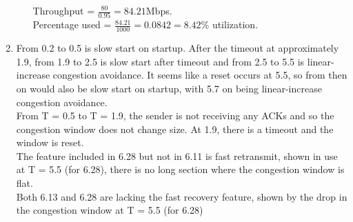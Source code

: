 \documentclass[12pt]{article}
\begin{document}
\begin{enumerate}
\begin{enumerate}
Throughput = $\frac{80}{0.95} = 84.21$Mbps.\\
Percentage used = $\frac{84.21}{1000} = 0.0842 = 8.42$\% utilization.
\end{enumerate}
\item %
From 0.2 to 0.5 is slow start on startup. After the timeout at approximately 1.9, from 1.9 to 2.5 is slow start after timeout and from 2.5 to 5.5 is linear-increase congestion avoidance. It seems like a reset occurs at 5.5, so from then on would also be slow start on startup, with 5.7 on being linear-increase congestion avoidance.\\
From T = 0.5 to T = 1.9, the sender is not receiving any ACKs and so the congestion window does not change size. At 1.9, there is a timeout and the window is reset.\\
The feature included in 6.28 but not in 6.11 is fast retransmit, shown in use at T = 5.5 (for 6.28), there is no long section where the congestion window is flat.\\
Both 6.13 and 6.28 are lacking the fast recovery feature, shown by the drop in the congestion window at T = 5.5 (for 6.28)
\end{enumerate}
\end{document}
